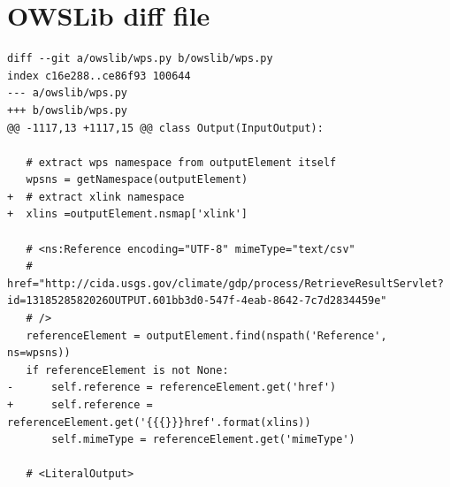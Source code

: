 \documentclass[12pt,a4paper]{article}
\begin{document}
\section{OWSLib diff file}
\label{app:owslib}
\begin{lstlisting}[basicstyle=\small,caption={OWSLib diff file}]
diff --git a/owslib/wps.py b/owslib/wps.py
index c16e288..ce86f93 100644
--- a/owslib/wps.py
+++ b/owslib/wps.py
@@ -1117,13 +1117,15 @@ class Output(InputOutput):
 
   # extract wps namespace from outputElement itself
   wpsns = getNamespace(outputElement)
+  # extract xlink namespace
+  xlins =outputElement.nsmap['xlink']
 
   # <ns:Reference encoding="UTF-8" mimeType="text/csv"
   # href="http://cida.usgs.gov/climate/gdp/process/RetrieveResultServlet?id=1318528582026OUTPUT.601bb3d0-547f-4eab-8642-7c7d2834459e"
   # />
   referenceElement = outputElement.find(nspath('Reference', ns=wpsns))
   if referenceElement is not None:
-      self.reference = referenceElement.get('href')
+      self.reference = referenceElement.get('{{{}}}href'.format(xlins))
       self.mimeType = referenceElement.get('mimeType')
 
   # <LiteralOutput>
\end{lstlisting}

\newpage
\end{document}
